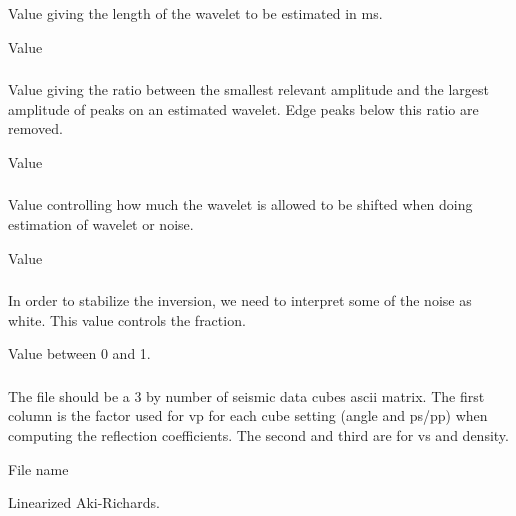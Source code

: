 \subsubsection{}
 \slist
   \item \Description Value giving the length of the wavelet to be estimated in ms.
   \item \Argument Value
   \item {}
 \elist

\subsubsection{}
 \slist
   \item \Description Value giving the ratio between the smallest relevant amplitude and the largest amplitude of peaks on an estimated wavelet. Edge peaks below this ratio are removed.
   \item \Argument Value
   \item {}
 \elist

\subsubsection{}
 \slist
   \item \Description Value controlling how much the wavelet is allowed to be shifted when doing estimation of wavelet or noise.
   \item \Argument Value
   \item {}
 \elist

 \subsubsection{}
 \slist
   \item \Description In order to stabilize the inversion, we need to interpret some of the noise as white. This value controls the fraction.
   \item \Argument Value between 0 and 1.
   \item {}
 \elist

\subsubsection{}
\slist
   \item \Description The file should be a 3 by  number of seismic data cubes ascii matrix. The first column is the factor used for vp for each cube setting (angle and ps/pp) when computing the reflection coefficients. The second and third are for vs and density.
   \item \Argument File name
   \item \Default Linearized Aki-Richards.
 \elist

